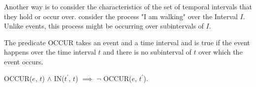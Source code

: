 Another way is to consider the characteristics of the set of temporal intervals that they hold or occur over. 
consider the process "I am walking" over the Interval $I$. Unlike events, this process might be occurring over subintervals of $I$.

The predicate OCCUR takes an event and a time interval and is true if the event happens over the time interval $t$ and there is no subinterval of $t$
over which the event occurs.

\begin{center}
  OCCUR($e$, $t$) $\land$ IN($t^\prime$, $t$) $\implies$ \(\lnot\) OCCUR($e$, $t^\prime$).
\end{center}

